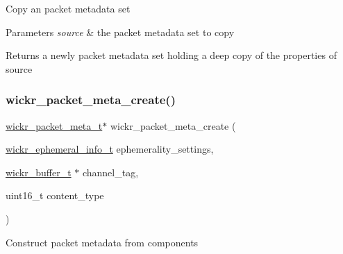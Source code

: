 Copy an packet metadata set


\begin{DoxyParams}{Parameters}
{\em source} & the packet metadata set to copy \\
\hline
\end{DoxyParams}
\begin{DoxyReturn}{Returns}
a newly packet metadata set holding a deep copy of the properties of \textquotesingle{}source\textquotesingle{} 
\end{DoxyReturn}
\mbox{\label{group__wickr__protocol_ga146144d74da12c1fff766462fe7fa661}} 
\subsubsection{\texorpdfstring{wickr\+\_\+packet\+\_\+meta\+\_\+create()}{wickr\_packet\_meta\_create()}}
{\footnotesize\ttfamily \mbox{\hyperlink{structwickr__packet__meta}{wickr\+\_\+packet\+\_\+meta\+\_\+t}}$\ast$ wickr\+\_\+packet\+\_\+meta\+\_\+create (\begin{DoxyParamCaption}\item[{\mbox{\hyperlink{structwickr__ephemeral__info}{wickr\+\_\+ephemeral\+\_\+info\+\_\+t}}}]{ephemerality\+\_\+settings,  }\item[{\mbox{\hyperlink{structwickr__buffer}{wickr\+\_\+buffer\+\_\+t}} $\ast$}]{channel\+\_\+tag,  }\item[{uint16\+\_\+t}]{content\+\_\+type }\end{DoxyParamCaption})}

Construct packet metadata from components


